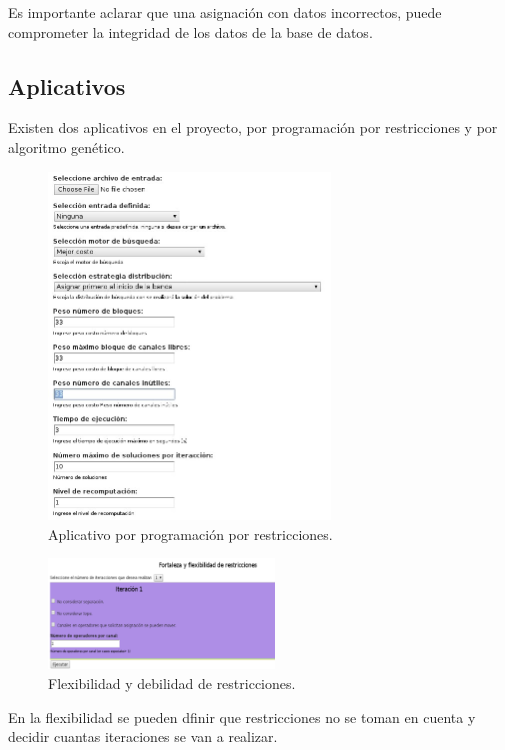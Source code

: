 \begin{multicols}{2}
Es importante aclarar que una asignación con datos incorrectos, puede comprometer la integridad de los datos de la base de datos.

\subsection*{Aplicativos} \label{manual:aplicativo}

Existen dos aplicativos en el proyecto, por programación por restricciones y por algoritmo genético. 

\begin{figure}[H]
	\centering
	\label{fig:appCPP}
	\includegraphics[width=7.5cm]{Anexos/Imagenes/ManualUsuario/Aplicacion.jpeg}
	\caption{ Aplicativo por programación por restricciones.}
\end{figure}

\begin{figure}[H]
	\centering
	\includegraphics[width=6cm]{Anexos/Imagenes/ManualUsuario/Flexibilidad.png}
	\caption{ Flexibilidad y debilidad de restricciones.}
\end{figure}

En la flexibilidad se pueden dfinir que restricciones no se toman en cuenta y decidir cuantas iteraciones se van a realizar.


\end{multicols}
